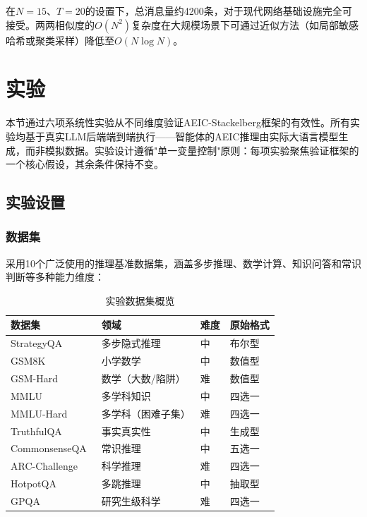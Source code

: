 \documentclass[12pt,a4paper,UTF8,fontset=fandol]{ctexart}
\begin{document}
在$N = 15$、$T = 20$的设置下，总消息量约4200条，对于现代网络基础设施完全可接受。两两相似度的$O(N^2)$复杂度在大规模场景下可通过近似方法（如局部敏感哈希或聚类采样）降低至$O(N \log N)$。

\section{实验}\label{sec:experiments}

本节通过六项系统性实验从不同维度验证AEIC-Stackelberg框架的有效性。所有实验均基于真实LLM后端端到端执行——智能体的AEIC推理由实际大语言模型生成，而非模拟数据。实验设计遵循"单一变量控制"原则：每项实验聚焦验证框架的一个核心假设，其余条件保持不变。

\subsection{实验设置}\label{sec:setup}

\subsubsection{数据集}

采用10个广泛使用的推理基准数据集，涵盖多步推理、数学计算、知识问答和常识判断等多种能力维度：

\begin{table}[H]
\centering
\caption{实验数据集概览}\label{tab:datasets}
\begin{tabular}{llll}
\toprule
数据集 & 领域 & 难度 & 原始格式 \\
\midrule
StrategyQA~\cite{geva2021strategyqa} & 多步隐式推理 & 中 & 布尔型 \\
GSM8K~\cite{cobbe2021gsm8k} & 小学数学 & 中 & 数值型 \\
GSM-Hard~\cite{gao2023gsmhard} & 数学（大数/陷阱） & 难 & 数值型 \\
MMLU~\cite{hendrycks2021mmlu} & 多学科知识 & 中 & 四选一 \\
MMLU-Hard~\cite{wang2024mmlupro} & 多学科（困难子集） & 难 & 四选一 \\
TruthfulQA~\cite{lin2022truthfulqa} & 事实真实性 & 中 & 生成型 \\
CommonsenseQA~\cite{talmor2019commonsenseqa} & 常识推理 & 中 & 五选一 \\
ARC-Challenge~\cite{clark2018arc} & 科学推理 & 难 & 四选一 \\
HotpotQA~\cite{yang2018hotpotqa} & 多跳推理 & 中 & 抽取型 \\
GPQA~\cite{rein2024gpqa} & 研究生级科学 & 难 & 四选一 \\
\bottomrule
\end{tabular}
\end{table}
\end{document}
